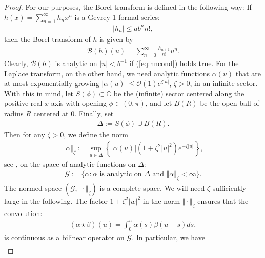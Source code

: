 \documentclass[reqno,12pt]{amsart}
\newcommand{\eqlab}[1]{\label{eq:#1}}
\renewcommand{\eqref}[1]{(\ref{eq:#1})}
\numberwithin{equation}{section}
\begin{document}
\begin{proof}
For our purposes, the Borel transform is defined in the following way: If $h(x)=\sum_{n=1}^\infty h_n x^n$ is a Gevrey-1 formal series: 
\begin{align}
\vert h_n\vert \le a b^n n!,\eqlab{hncond}
\end{align}
then the Borel transform of $h$ is given by
\begin{align*}
 \mathcal B(h)(u) = \sum_{n=0}^\infty \frac{h_{n+1}}{n!} u^n.
\end{align*}
Clearly, $\mathcal B(h)$ is analytic on $\vert u\vert <b^{-1}$ if \eqref{hncond} holds true. For the Laplace transform, on the other hand, we need analytic functions $\alpha(u)$ that are at most exponentially growing $\vert \alpha(u)\vert \le \mathcal O(1) e^{\zeta\vert u\vert}$, $\zeta>0$, in an infinite sector. With this in mind, let $S(\phi)\subset \mathbb C$ be the (infinite) sector centered along the positive real $x$-axis with opening $\phi\in (0,\pi)$, and let $B(R)$ be the open ball of radius $R$ centered at $0$. Finally, set 
\begin{align*}
 \Delta := S(\phi)\cup B(R).
\end{align*}
Then for any $\zeta>0$,
we define the norm 
\begin{align}
\Vert \alpha\Vert_\zeta:=\sup_{u\in \Delta} \left\{\vert \alpha(u)\vert (1+\zeta^2 \vert u\vert^2)e^{-\zeta \vert u\vert}\right\},\eqlab{normG}
\end{align}
see \cite{bonckaert2008a}, 
on the space of analytic  functions on $\Delta$:
\begin{align*}
  \mathcal G:=\{\alpha:\alpha \mbox{  is analytic on  } \Delta \mbox{ and } \Vert \alpha\Vert_\zeta<\infty\}.
\end{align*}
The normed space $(\mathcal G,\Vert \cdot\Vert_\zeta)$ is a complete space. We will need $\zeta$ sufficiently large in the following.
The factor $1+\zeta^2 \vert w\vert^2$ in the norm $\Vert \cdot \Vert_{\zeta}$ ensures that the convolution:
 \begin{align*}
  (\alpha \star \beta)(u) = \int_0^u \alpha(s) \beta(u-s)ds,
 \end{align*}
 is continuous as a bilinear operator on $\mathcal G$. In particular, we have
\begin{align*}

\end{align*}
\end{proof}
\end{document}
